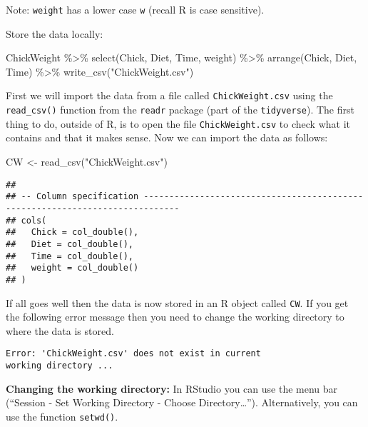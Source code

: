 \documentclass[
]{book}
\newenvironment{Shaded}{\begin{snugshade}}{\end{snugshade}}
\newcommand{\FunctionTok}[1]{\textcolor[rgb]{0.00,0.00,0.00}{#1}}
\newcommand{\NormalTok}[1]{#1}
\newcommand{\OtherTok}[1]{\textcolor[rgb]{0.56,0.35,0.01}{#1}}
\newcommand{\SpecialCharTok}[1]{\textcolor[rgb]{0.00,0.00,0.00}{#1}}
\newcommand{\StringTok}[1]{\textcolor[rgb]{0.31,0.60,0.02}{#1}}
\begin{document}
Note: \texttt{weight} has a lower case \texttt{w} (recall R is case sensitive).

Store the data locally:

\begin{Shaded}
\begin{Highlighting}[]
\NormalTok{ChickWeight }\SpecialCharTok{\%\textgreater{}\%}
  \FunctionTok{select}\NormalTok{(Chick, Diet, Time, weight) }\SpecialCharTok{\%\textgreater{}\%} 
  \FunctionTok{arrange}\NormalTok{(Chick, Diet, Time) }\SpecialCharTok{\%\textgreater{}\%} 
  \FunctionTok{write\_csv}\NormalTok{(}\StringTok{"ChickWeight.csv"}\NormalTok{)}
\end{Highlighting}
\end{Shaded}

First we will import the data from a file called \texttt{ChickWeight.csv} using the \texttt{read\_csv()}
function from the \texttt{readr} package (part of the \texttt{tidyverse}). The first thing to do,
outside of R, is to open the file \texttt{ChickWeight.csv} to check what it contains and that
it makes sense. Now we can import the data as follows:

\begin{Shaded}
\begin{Highlighting}[]
\NormalTok{CW }\OtherTok{\textless{}{-}} \FunctionTok{read\_csv}\NormalTok{(}\StringTok{"ChickWeight.csv"}\NormalTok{)}
\end{Highlighting}
\end{Shaded}

\begin{verbatim}
## 
## -- Column specification -----------------------------------------------------------------------------
## cols(
##   Chick = col_double(),
##   Diet = col_double(),
##   Time = col_double(),
##   weight = col_double()
## )
\end{verbatim}

If all goes well then the data is now stored in an R object called \texttt{CW}. If you get the
following error message then you need to change the working directory to where the data is
stored.

\begin{verbatim}
Error: 'ChickWeight.csv' does not exist in current
working directory ...
\end{verbatim}

\textbf{Changing the working directory:}
In RStudio you can use the menu bar (``Session - Set Working Directory - Choose Directory\ldots{}''). Alternatively, you can use the function \texttt{setwd()}.
\end{document}

